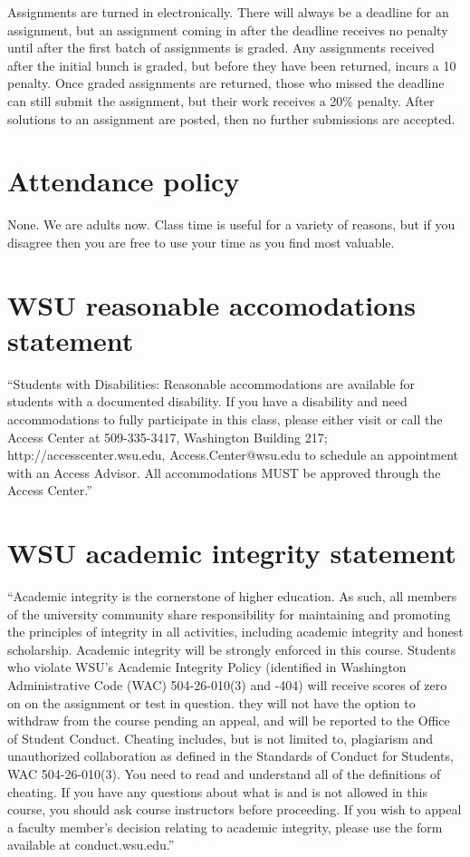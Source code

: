 \documentclass[12pt]{article}
\begin{document}
Assignments are turned in electronically. There will always be a
deadline for an assignment, but an assignment coming in after the
deadline receives no penalty until after the first batch of
assignments is graded. Any assignments received after the initial
bunch is graded, but before they have been returned, incurs a 10%
penalty. Once graded assignments are returned, those who missed the
deadline can still submit the assignment, but their work receives a
20\% penalty. After solutions to an assignment are posted, then no
further submissions are accepted.

\section*{Attendance policy}

None. We are adults now. Class time is useful for a variety of
reasons, but if you disagree then you are free to use your time as you
find most valuable.

\section*{WSU reasonable accomodations statement}

``Students with Disabilities: Reasonable accommodations are available
for students with a documented disability. If you have a disability
and need accommodations to fully participate in this class, please
either visit or call the Access Center at 509-335-3417, Washington
Building 217; http://accesscenter.wsu.edu, Access.Center@wsu.edu to
schedule an appointment with an Access Advisor. All accommodations
MUST be approved through the Access Center.''

\section*{WSU academic integrity statement}

``Academic integrity is the cornerstone of higher education. As such,
all members of the university community share responsibility for
maintaining and promoting the principles of integrity in all
activities, including academic integrity and honest
scholarship. Academic integrity will be strongly enforced in this
course. Students who violate WSU's Academic Integrity Policy
(identified in Washington Administrative Code (WAC) 504-26-010(3) and
-404) will receive scores of zero on on the assignment or test in
question. they will not have the option to withdraw from the course
pending an appeal, and will be reported to the Office of Student
Conduct. Cheating includes, but is not limited to, plagiarism and
unauthorized collaboration as defined in the Standards of Conduct for
Students, WAC 504-26-010(3). You need to read and understand all of
the definitions of cheating. If you have any questions about what is
and is not allowed in this course, you should ask course instructors
before proceeding. If you wish to appeal a faculty member's decision
relating to academic integrity, please use the form available at
conduct.wsu.edu.''
\end{document}
